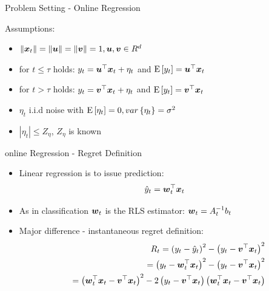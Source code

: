 \documentclass{beamer}
\begin{document}
\begin{frame}{Problem Setting - Online Regression}

Assumptions:\newline
\begin{itemize}
\item $\|{\boldsymbol{x}}_{t}\|=\|{\boldsymbol{u}}\|=\|{\boldsymbol{v}}\|=1, {\boldsymbol{u}}, {\boldsymbol{v}}\in R^d$\newline
\item for $t\leq\tau$ holds:\newline\newline
 $y_t={{\boldsymbol{u}}}^{\top}{\boldsymbol{x}}_{t}+\eta_t$ and ${\rm E}\left[{y_t}\right]={{\boldsymbol{u}}}^{\top}{\boldsymbol{x}}_{t}$\newline

\item for $t>\tau$ holds:\newline\newline
 $y_t={{\boldsymbol{v}}}^{\top}{\boldsymbol{x}}_{t}+\eta_t$ and ${\rm E}\left[{y_t}\right]={{\boldsymbol{v}}}^{\top}{\boldsymbol{x}}_{t}$\newline
\item $\eta_t$ i.i.d noise with ${\rm E}\left[{\eta_t}\right]=0, var\left\{\eta_t\right\}=\sigma^2$ \newline
\item $\left\vert\eta_t\right\vert\leq Z_{\eta}$, $Z_{\eta}$ is known
\end{itemize}


\end{frame}

\begin{frame}{online Regression - Regret Definition}
\begin{itemize}
\item Linear regression is to issue prediction:\newline
\begin{equation*}
\hat{y}_t={{\boldsymbol{w}}}^{\top}_{t}{\boldsymbol{x}}_{t}
\end{equation*}
\item As in classification ${\boldsymbol{w}}_{t}$ is the RLS estimator: ${\boldsymbol{w}}_{t}=A_{t}^{-1}b_t$\newline
\item Major difference - instantaneous regret definition:
\begin{eqnarray*}
&&R_t=\left(y_t-\hat{y}_t\right)^2-\left(y_t-{{\boldsymbol{v}}}^{\top}{\boldsymbol{x}}_{t}\right)^2\\
&&=\left(y_t-{{\boldsymbol{w}}}^{\top}_{t}{\boldsymbol{x}}_{t}\right)^2-\left(y_t-{{\boldsymbol{v}}}^{\top}{\boldsymbol{x}}_{t}\right)^2\\
&&=\left({{\boldsymbol{w}}}^{\top}_{t}{\boldsymbol{x}}_{t}-{{\boldsymbol{v}}}^{\top}{\boldsymbol{x}}_{t}\right)^2-2\left(y_t-{{\boldsymbol{v}}}^{\top}{\boldsymbol{x}}_{t}\right)\left({{\boldsymbol{w}}}^{\top}_{t}{\boldsymbol{x}}_{t}-{{\boldsymbol{v}}}^{\top}{\boldsymbol{x}}_{t}\right)
\end{eqnarray*}
\end{itemize}
\end{frame}
\end{document}
